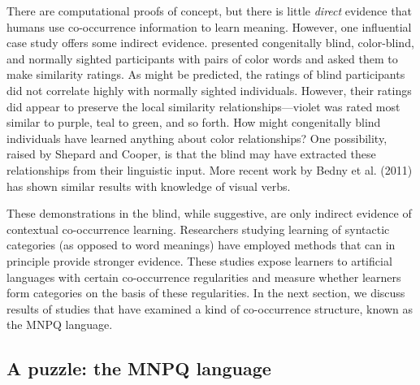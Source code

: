 \documentclass[man,floatsintext]{apa6}
\begin{document}
There are computational proofs of concept, but there is little \emph{direct} evidence that humans use co-occurrence information to learn meaning. However, one influential case study offers some indirect evidence. \citet{shepard1992} presented congenitally blind, color-blind, and normally sighted participants with pairs of color words and asked them to make similarity ratings. As might be predicted, the ratings of blind participants did not correlate highly with normally sighted individuals. However, their ratings did appear to preserve the local similarity relationships---violet was rated most similar to purple, teal to green, and so forth. How might congenitally blind individuals have learned anything about color relationships? One possibility, raised by Shepard and Cooper, is that the blind may have extracted these relationships from their linguistic input. More recent work by Bedny et al. (2011) has shown similar results with knowledge of visual verbs.

These demonstrations in the blind, while suggestive, are only indirect evidence of contextual co-occurrence learning. Researchers studying learning of syntactic categories (as opposed to word meanings) have employed methods that can in principle provide stronger evidence. These studies expose learners to artificial languages with certain co-occurrence regularities and measure whether learners form categories on the basis of these regularities. In the next section, we discuss results of studies that have examined a kind of co-occurrence structure, known as the MNPQ language.

\subsection{A puzzle: the MNPQ language}
\end{document}
